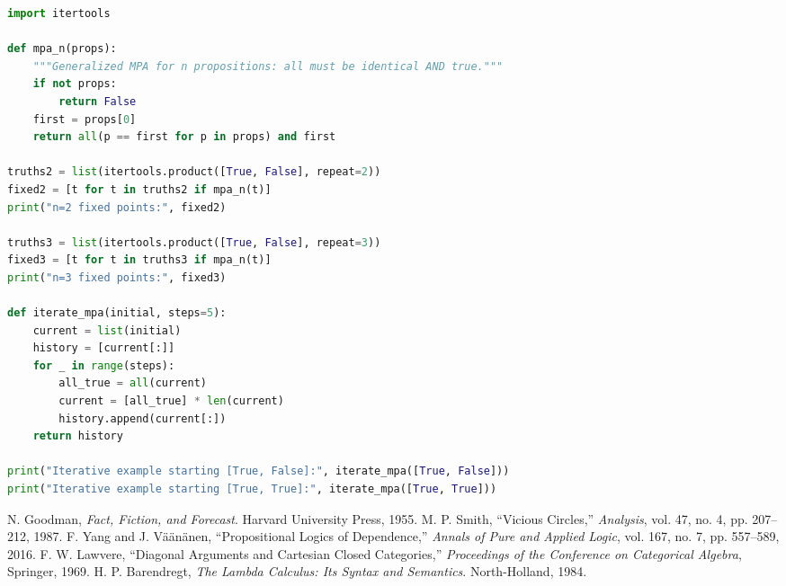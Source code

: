 \documentclass[11pt,a4paper]{article}
\begin{document}
\begin{lstlisting}[language=Python,basicstyle=\ttfamily\small,backgroundcolor=\color{gray!10},frame=single]
import itertools

def mpa_n(props):
    """Generalized MPA for n propositions: all must be identical AND true."""
    if not props:
        return False
    first = props[0]
    return all(p == first for p in props) and first

truths2 = list(itertools.product([True, False], repeat=2))
fixed2 = [t for t in truths2 if mpa_n(t)]
print("n=2 fixed points:", fixed2)

truths3 = list(itertools.product([True, False], repeat=3))
fixed3 = [t for t in truths3 if mpa_n(t)]
print("n=3 fixed points:", fixed3)

def iterate_mpa(initial, steps=5):
    current = list(initial)
    history = [current[:]]
    for _ in range(steps):
        all_true = all(current)
        current = [all_true] * len(current)
        history.append(current[:])
    return history

print("Iterative example starting [True, False]:", iterate_mpa([True, False]))
print("Iterative example starting [True, True]:", iterate_mpa([True, True]))
\end{lstlisting}

\begin{thebibliography}{9}
 N. Goodman, \emph{Fact, Fiction, and Forecast}. Harvard University Press, 1955.
 M. P. Smith, ``Vicious Circles,'' \emph{Analysis}, vol. 47, no. 4, pp. 207--212, 1987.
 F. Yang and J. V\"a\"an\"anen, ``Propositional Logics of Dependence,'' \emph{Annals of Pure and Applied Logic}, vol. 167, no. 7, pp. 557--589, 2016.
 F. W. Lawvere, ``Diagonal Arguments and Cartesian Closed Categories,'' \emph{Proceedings of the Conference on Categorical Algebra}, Springer, 1969.
 H. P. Barendregt, \emph{The Lambda Calculus: Its Syntax and Semantics}. North-Holland, 1984.
\end{thebibliography}
\end{document}
